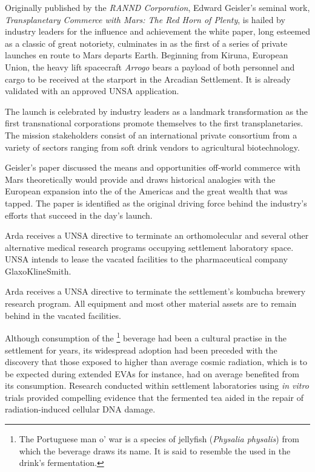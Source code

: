 

Originally published by the {\it RANND Corporation}, Edward Geisler's seminal work, {\it Transplanetary Commerce with Mars: The Red Horn of Plenty}, is hailed by industry leaders for the influence and achievement the white paper, long esteemed as a classic of great notoriety, culminates in as the first of a series of private launches en route to Mars departs Earth. Beginning from Kiruna, European Union, the heavy lift spacecraft {\it Arrogo} bears a payload of both personnel and cargo to be received at the starport in the Arcadian Settlement. It is already validated with an approved UNSA application.

The launch is celebrated by industry leaders as a landmark transformation as the first transnational corporations promote themselves to the first transplanetaries. The mission stakeholders consist of an international private consortium from a variety of sectors ranging from soft drink vendors to agricultural biotechnology.

Geisler's paper discussed the means and opportunities off-world commerce with Mars theoretically would provide and draws historical analogies with the European expansion into the  of the Americas and the great wealth that was tapped. The paper is identified as the original driving force behind the industry's efforts that succeed in the day's launch.
\StopTimelineDate

Arda receives a UNSA directive to terminate an orthomolecular and several other alternative medical research programs occupying settlement laboratory space. UNSA intends to lease the vacated facilities to the pharmaceutical company GlaxoKlineSmith.
\StopTimelineDate

Arda receives a UNSA directive to terminate the settlement's kombucha brewery research program. All equipment and most other material assets are to remain behind in the vacated facilities. 

Although consumption of the \footnote{The Portuguese man o' war is a species of jellyfish ({\it Physalia physalis}) from which the beverage draws its name. It is said to resemble the  used in the drink's fermentation.} beverage had been a cultural practise in the settlement for years, its widespread adoption had been preceded with the discovery that those exposed to higher than average cosmic radiation, which is to be expected during extended EVAs for instance, had on average benefited from its consumption. Research conducted within settlement laboratories using {\it in vitro} trials provided compelling evidence that the fermented tea aided in the repair of radiation-induced cellular DNA damage. 

